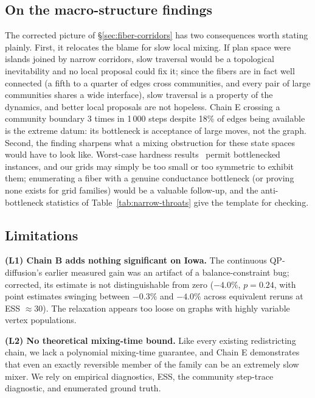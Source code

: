\documentclass[11pt]{article}
\begin{document}
\subsection{On the macro-structure findings}\label{sec:disc-throats}

The corrected picture of \S\ref{sec:fiber-corridors} has two
consequences worth stating plainly. First, it relocates the blame for
slow local mixing. If plan space were islands joined by narrow
corridors, slow traversal would be a topological inevitability and no
local proposal could fix it; since the fibers are in fact well
connected (a fifth to a quarter of edges cross communities, and every
pair of large communities shares a wide interface), slow traversal is
a property of the dynamics, and better local proposals are not
hopeless. Chain E crossing a community boundary 3 times in 1\,000
steps despite 18\% of edges being available is the extreme datum: its
bottleneck is acceptance of large moves, not the graph. Second, the
finding sharpens what a mixing obstruction for these state spaces
would have to look like. Worst-case hardness
results~\cite{akitaya2022reconfiguration,charikar2023complexity}
permit bottlenecked instances, and our grids may simply be too small
or too symmetric to exhibit them; enumerating a fiber with a genuine
conductance bottleneck (or proving none exists for grid families)
would be a valuable follow-up, and the anti-bottleneck statistics of
Table~\ref{tab:narrow-throats} give the template for checking.

\subsection{Limitations}\label{sec:disc-limits}

\textbf{(L1) Chain B adds nothing significant on Iowa.} The
continuous QP-diffusion's earlier measured gain was an artifact of a
balance-constraint bug; corrected, its estimate is not
distinguishable from zero ($-4.0\%$, $p = 0.24$, with point estimates
swinging between $-0.3\%$ and $-4.0\%$ across equivalent reruns at
ESS $\approx 30$). The relaxation appears too loose on graphs with
highly variable vertex populations.

\textbf{(L2) No theoretical mixing-time bound.} Like every existing
redistricting chain, we lack a polynomial mixing-time guarantee, and
Chain E demonstrates that even an exactly reversible member of the
family can be an extremely slow mixer. We rely on empirical
diagnostics, ESS, the community step-trace diagnostic, and enumerated
ground truth.
\end{document}
